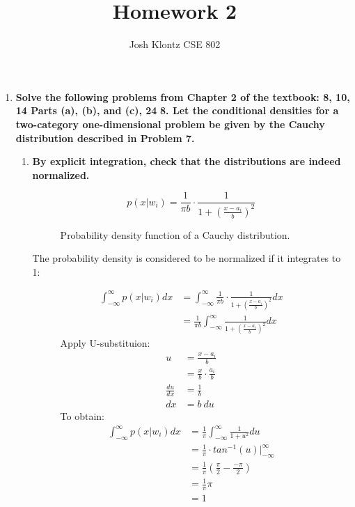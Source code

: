 \documentclass[12pt]{article}
\begin{document}
 
\title{Homework 2}
\author{Josh Klontz
CSE 802}
 
\maketitle

\begin{enumerate}
\item \textbf{Solve the following problems from Chapter 2 of the textbook: 8, 10, 14 Parts (a), (b), and (c), 24}
  \subitem \textbf{8. Let the conditional densities for a two-category one-dimensional problem be given by the Cauchy distribution described in Problem 7.}
  \begin{enumerate}
  \item \textbf{By explicit integration, check that the distributions are indeed normalized.}
    \begin{figure}[H]
    \begin{equation}
      p(x|w_i) = \frac{1}{\pi b} \cdot \frac{1}{1 + (\frac{x-a_i}{b})^2}
    \end{equation}
    \caption{Probability density function of a Cauchy distribution.}
    \end{figure}
    The probability density is considered to be normalized if it integrates to 1:
    \begin{figure}[H]
    \begin{equation}
    \begin{split}
      \int_{-\infty}^{\infty} p(x|w_i) dx& = \int_{-\infty}^{\infty} \frac{1}{\pi b} \cdot \frac{1}{1 + (\frac{x-a_i}{b})^2} dx \\
      & = \frac{1}{\pi b} \int_{-\infty}^{\infty} \frac{1}{1 + (\frac{x-a_i}{b})^2} dx
    \end{split}
    \end{equation}
    Apply U-substituion:
    \begin{equation}
    \begin{split}
      u& = \frac{x-a_i}{b} \\
      & = \frac{x}{b} \cdot \frac{a_i}{b} \\
    \frac{du}{dx}& = \frac{1}{b} \\
    dx& = b\ du
    \end{split}
    \end{equation}
    To obtain:
    \begin{equation}
    \begin{split}
      \int_{-\infty}^{\infty} p(x|w_i) dx& = \frac{1}{\pi} \int_{-\infty}^{\infty} \frac{1}{1 + u^2} du \\
      & = \frac{1}{\pi} \cdot tan^{-1}(u) |_{-\infty}^{\infty} \\
      & = \frac{1}{\pi} (\frac{\pi}{2} - \frac{-\pi}{2}) \\
      & = \frac{1}{\pi} \pi \\
      & \boxed{= 1}
    \end{split}
    \end{equation}
    \end{figure}
  \end{enumerate}

\end{enumerate}
 
\end{document}
